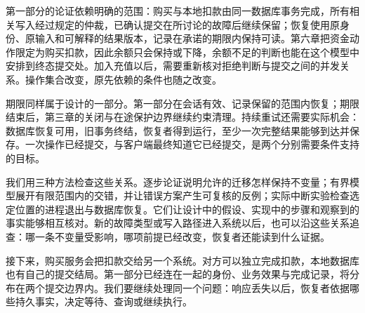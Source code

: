 第一部分的论证依赖明确的范围：购买与本地扣款由同一数据库事务完成，所有相关写入经过规定的仲裁，已确认提交在所讨论的故障后继续保留；恢复使用原身份、原输入和可解释的结果版本，记录在承诺的期限内保持可读。第六章把资金动作限定为购买扣款，因此余额只会保持或下降，余额不足的判断也能在这个模型中安排到终态提交处。加入充值以后，需要重新核对拒绝判断与提交之间的并发关系。操作集合改变，原先依赖的条件也随之改变。

期限同样属于设计的一部分。第一部分在会话有效、记录保留的范围内恢复；期限结束后，第三章的关闭与在途保护边界继续约束清理。持续重试还需要实际机会：数据库恢复可用，旧事务终结，恢复者得到运行，至少一次完整结果能够到达并保存。一次操作已经提交，与客户端最终知道它已经提交，是两个分别需要条件支持的目标。

我们用三种方法检查这些关系。逐步论证说明允许的迁移怎样保持不变量；有界模型展开有限范围内的交错，并让错误方案产生可复核的反例；实际中断实验检查选定位置的进程退出与数据库恢复。它们让设计中的假设、实现中的步骤和观察到的事实能够相互核对。新的故障类型或写入路径进入系统以后，也可以沿这些关系追查：哪一条不变量受影响，哪项前提已经改变，恢复者还能读到什么证据。

接下来，购买服务会把扣款交给另一个系统。对方可以独立完成扣款，本地数据库也有自己的提交结局。第一部分已经连在一起的身份、业务效果与完成记录，将分布在两个提交边界内。我们要继续处理同一个问题：响应丢失以后，恢复者依据哪些持久事实，决定等待、查询或继续执行。
